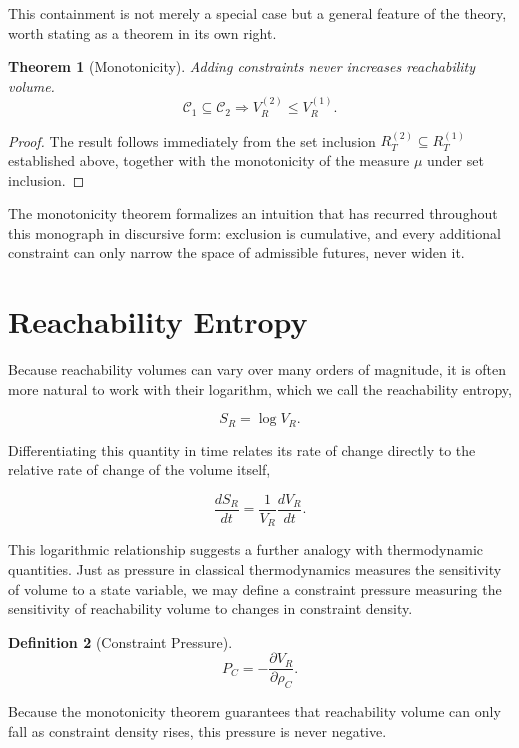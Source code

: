 \documentclass[11pt,oneside]{book}
\theoremstyle{plain}
\newtheorem{theorem}{Theorem}[chapter]
\theoremstyle{definition}
\newtheorem{definition}[theorem]{Definition}
\theoremstyle{remark}
\begin{document}
This containment is not merely a special case but a general feature of the theory, worth stating as a theorem in its own right.

\begin{theorem}[Monotonicity]
Adding constraints never increases reachability volume.
\[
\mathcal C_1
\subseteq
\mathcal C_2
\Longrightarrow
V_R^{(2)}
\le
V_R^{(1)}.
\]
\end{theorem}

\begin{proof}
The result follows immediately from the set inclusion \(R_T^{(2)}\subseteq R_T^{(1)}\) established above, together with the monotonicity of the measure \(\mu\) under set inclusion.
\end{proof}

The monotonicity theorem formalizes an intuition that has recurred throughout this monograph in discursive form: exclusion is cumulative, and every additional constraint can only narrow the space of admissible futures, never widen it.

\section{Reachability Entropy}

Because reachability volumes can vary over many orders of magnitude, it is often more natural to work with their logarithm, which we call the reachability entropy,

\[
S_R
=
\log V_R.
\]

Differentiating this quantity in time relates its rate of change directly to the relative rate of change of the volume itself,

\[
\frac{dS_R}{dt}
=
\frac{1}{V_R}
\frac{dV_R}{dt}.
\]

This logarithmic relationship suggests a further analogy with thermodynamic quantities. Just as pressure in classical thermodynamics measures the sensitivity of volume to a state variable, we may define a constraint pressure measuring the sensitivity of reachability volume to changes in constraint density.

\begin{definition}[Constraint Pressure]
\[
P_C
=
-
\frac{\partial V_R}
{\partial
\rho_C}.
\]
\end{definition}

Because the monotonicity theorem guarantees that reachability volume can only fall as constraint density rises, this pressure is never negative.
\end{document}
